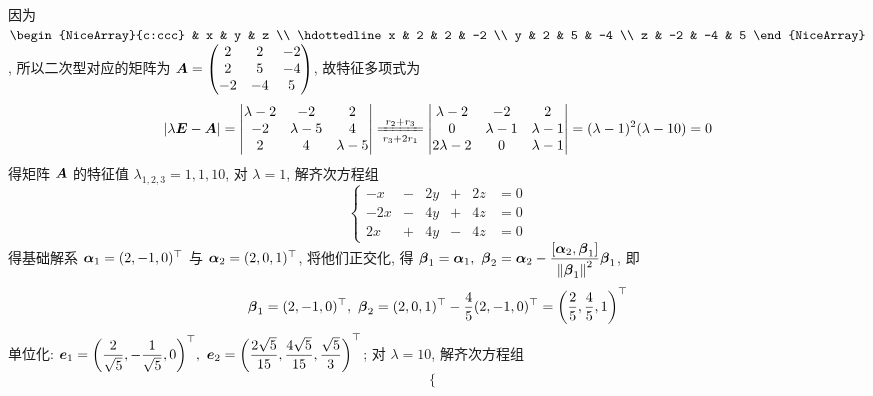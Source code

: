 \begin{solution}
    因为 $\begin{NiceArray}{c:ccc}
              & x  & y  & z  \\ \hdottedline
            x & 2  & 2  & -2 \\
            y & 2  & 5  & -4 \\
            z & -2 & -4 & 5
        \end{NiceArray}$, 所以二次型对应的矩阵为 $\vb*{A}=\begin{pmatrix}
            2  & 2  & -2 \\
            2  & 5  & -4 \\
            -2 & -4 & 5
        \end{pmatrix}$, 故特征多项式为
    $$|\lambda\vb*{E}-\vb*{A}|=\begin{vmatrix}
            \lambda -2 & -2         & 2         \\
            -2         & \lambda -5 & 4         \\
            2          & 4          & \lambda-5
        \end{vmatrix}\xlongequal[r_3+2r_1]{r_2+r_3}\begin{vmatrix}
            \lambda -2  & -2         & 2          \\
            0           & \lambda -1 & \lambda -1 \\
            2\lambda -2 & 0          & \lambda -1
        \end{vmatrix}=(\lambda-1)^2(\lambda-10)=0$$
    得矩阵 $\vb*{A}$ 的特征值 $\lambda_{1,2,3}=1,1,10$, 对 $\lambda=1$, 解齐次方程组
    $$\left\{\begin{matrix}
            -x  & - & 2y & + & 2z & =0 \\
            -2x & - & 4y & + & 4z & =0 \\
            2x  & + & 4y & - & 4z & =0
        \end{matrix}\right.$$
    得基础解系 $\vb*{\alpha}_1=(2,-1,0)^\top$ 与 $\vb*{\alpha}_2=(2,0,1)^\top$, 将他们正交化, 得 $\vb*{\beta}_1=\vb*{\alpha}_1,~\vb*{\beta}_2=\vb*{\alpha}_2-\dfrac{\comm{\vb*{\alpha}_2}{\vb*{\beta}_1}}{\norm{\vb*{\beta}_1}^2}\vb*{\beta}_1$, 即
    $$\vb*{\beta}_1=(2,-1,0)^\top,~\vb*{\beta}_2=(2,0,1)^\top-\dfrac{4}{5}(2,-1,0)^\top=\qty(\dfrac{2}{5},\dfrac{4}{5},1)^\top$$
    单位化: $\vb*{e}_1=\qty(\dfrac{2}{\sqrt{5}},-\dfrac{1}{\sqrt{5}},0)^\top,~\vb*{e}_2=\qty(\dfrac{2\sqrt{5}}{15},\dfrac{4\sqrt{5}}{15},\dfrac{\sqrt{5}}{3})^\top$; 对 $\lambda=10$, 解齐次方程组
    $$\left\{\begin{matrix}

\end{matrix}$$
\end{solution}
